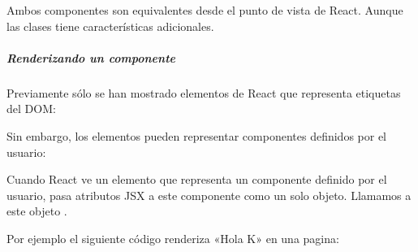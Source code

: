 %
\begin{sphinxVerbatim}[commandchars=\\\{\}]
    
    
        
\end{sphinxVerbatim}

Ambos componentes son equivalentes desde el punto de vista de React. Aunque las
clases tiene características adicionales.


\subparagraph{Renderizando un componente}
\label{\detokenize{reactjs:renderizando-un-componente}}
Previamente sólo se han mostrado elementos de React que representa etiquetas
del DOM:

%
\begin{sphinxVerbatim}[commandchars=\\\{\}]
     
\end{sphinxVerbatim}

Sin embargo, los elementos pueden representar componentes definidos por el
usuario:

%
\begin{sphinxVerbatim}[commandchars=\\\{\}]
     
\end{sphinxVerbatim}

Cuando React ve un elemento que representa un componente definido por el usuario,
pasa atributos JSX a este componente como un solo objeto. Llamamos a este
objeto .

Por ejemplo el siguiente código renderiza «Hola K» en una pagina:

%
\begin{sphinxVerbatim}[commandchars=\\\{\}]
  
    

     
\end{sphinxVerbatim}


